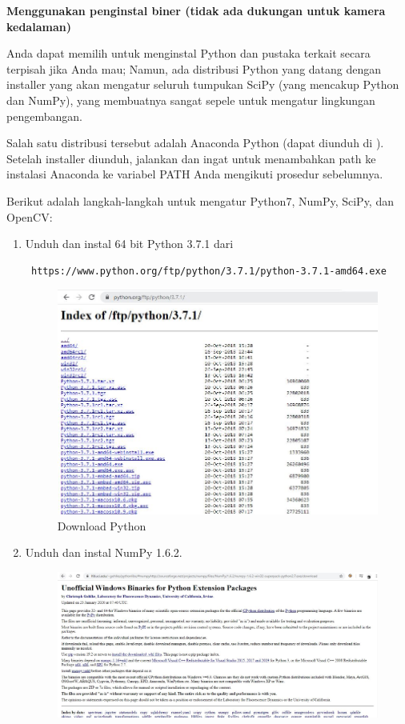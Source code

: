 \newpage
\textbf{Menggunakan penginstal biner (tidak ada dukungan untuk kamera kedalaman)}

Anda dapat memilih untuk menginstal Python dan pustaka terkait secara terpisah jika Anda mau; Namun, ada distribusi Python yang datang dengan installer yang akan mengatur seluruh tumpukan SciPy (yang mencakup Python dan NumPy), yang membuatnya sangat sepele untuk mengatur lingkungan pengembangan.
	
Salah satu distribusi tersebut adalah Anaconda Python (dapat diunduh di ). Setelah installer diunduh, jalankan dan ingat untuk menambahkan path ke instalasi Anaconda ke variabel PATH Anda mengikuti prosedur sebelumnya.

Berikut adalah langkah-langkah untuk mengatur Python7, NumPy, SciPy, dan OpenCV:
\begin{enumerate}
	\item Unduh dan instal 64 bit Python 3.7.1 dari \begin{verbatim} https://www.python.org/ftp/python/3.7.1/python-3.7.1-amd64.exe \end{verbatim}
		\begin{figure}[ht]
		\centering
		\includegraphics[scale=0.5]{figures/1,1.jpg}
		\caption{Download Python}
		\label{contoh}
		\end{figure}
\newpage
	\item Unduh dan instal NumPy 1.6.2.
		\begin{figure}[ht]
		\centering
		\includegraphics[scale=0.5]{figures/1,2.jpg}

\end{figure}
\end{enumerate}
